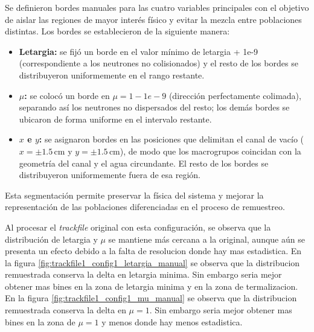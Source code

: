 

Se definieron bordes manuales para las cuatro variables principales con el objetivo de aislar las regiones de mayor interés físico y evitar la mezcla entre poblaciones distintas. Los bordes se establecieron de la siguiente manera:

\begin{itemize}
    \item \textbf{Letargia:} se fijó un borde en el valor mínimo de letargia + 1e-9 (correspondiente a los neutrones no colisionados) y el resto de los bordes se distribuyeron uniformemente en el rango restante.
    \item \textbf{$\mu$:} se colocó un borde en $\mu = 1-1e-9$ (dirección perfectamente colimada), separando así los neutrones no dispersados del resto; los demás bordes se ubicaron de forma uniforme en el intervalo restante.
    \item \textbf{$x$ e $y$:} se asignaron bordes en las posiciones que delimitan el canal de vacío ($x = \pm 1.5\,\text{cm}$ y $y = \pm 1.5\,\text{cm}$), de modo que los macrogrupos coincidan con la geometría del canal y el agua circundante. El resto de los bordes se distribuyeron uniformemente fuera de esa región.
\end{itemize}

Esta segmentación permite preservar la física del sistema y mejorar la representación de las poblaciones diferenciadas en el proceso de remuestreo.

Al procesar el \emph{trackfile} original con esta configuración, se observa que la distribución de letargia y $\mu$ se mantiene más cercana a la original, aunque aún se presenta un efecto debido a la falta de resolucion donde hay mas estadistica. En la figura \ref{fig:trackfile1_config1_letargia_manual} se observa que la distribucion remuestrada conserva la delta en letargia minima. Sin embargo seria mejor obtener mas bines en la zona de letargia minima y en la zona de termalizacion. En la figura \ref{fig:trackfile1_config1_mu_manual} se observa que la distribucion remuestrada conserva la delta en $\mu = 1$. Sin embargo seria mejor obtener mas bines en la zona de $\mu = 1$ y menos donde hay menos estadistica.

